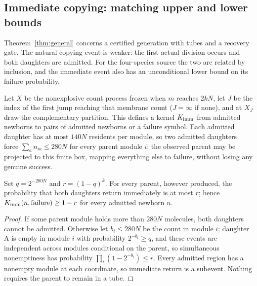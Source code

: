 \subsection{Immediate copying: matching upper and lower bounds}\label{sec:immediate}
Theorem~\ref{thm:general} concerns a certified generation with tubes and a recovery gate. The natural copying event is weaker: the first actual division occurs and both daughters are admitted. For the four-species source the two are related by inclusion, and the immediate event also has an unconditional lower bound on its failure probability.

Let $X$ be the nonexplosive count process frozen when $m$ reaches $2kN$, let $J$ be the index of the first jump reaching that membrane count ($J=\infty$ if none), and at $X_J$ draw the complementary partition. This defines a kernel $K_{\rm imm}$ from admitted newborns to pairs of admitted newborns or a failure symbol. Each admitted daughter has at most $140N$ residents per module, so two admitted daughters force $\sum_an_{ia}\le280N$ for every parent module $i$; the observed parent may be projected to this finite box, mapping everything else to failure, without losing any genuine success.

\begin{lemma}\label{lem:partition}
Set $q=2^{-280N}$ and $r=(1-q)^k$. For every parent, however produced, the probability that both daughters return immediately is at most $r$; hence $K_{\rm imm}(n,\mathrm{failure})\ge1-r$ for every admitted newborn $n$.
\end{lemma}
\begin{proof}
If some parent module holds more than $280N$ molecules, both daughters cannot be admitted. Otherwise let $b_i\le280N$ be the count in module $i$; daughter A is empty in module $i$ with probability $2^{-b_i}\ge q$, and these events are independent across modules conditional on the parent, so simultaneous nonemptiness has probability $\prod_i(1-2^{-b_i})\le r$. Every admitted region has a nonempty module at each coordinate, so immediate return is a subevent. Nothing requires the parent to remain in a tube.
\end{proof}

